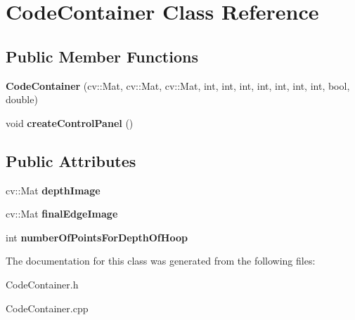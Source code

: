 \hypertarget{classCodeContainer}{
\section{CodeContainer Class Reference}
\label{classCodeContainer}
}
\subsection*{Public Member Functions}
\begin{DoxyCompactItemize}
\item 
\hypertarget{classCodeContainer_a2a811a80e563fe171224eeb2684895df}{
{\bfseries CodeContainer} (cv::Mat, cv::Mat, cv::Mat, int, int, int, int, int, int, int, bool, double)}
\label{classCodeContainer_a2a811a80e563fe171224eeb2684895df}

\item 
\hypertarget{classCodeContainer_a70a3f228bf3526fc607aa79e655a90b7}{
void {\bfseries createControlPanel} ()}
\label{classCodeContainer_a70a3f228bf3526fc607aa79e655a90b7}

\end{DoxyCompactItemize}
\subsection*{Public Attributes}
\begin{DoxyCompactItemize}
\item 
\hypertarget{classCodeContainer_aa6268e4b294280a596d72da042c2f582}{
cv::Mat {\bfseries depthImage}}
\label{classCodeContainer_aa6268e4b294280a596d72da042c2f582}

\item 
\hypertarget{classCodeContainer_a229e9d396276f358aabfd2b7a6a53b3e}{
cv::Mat {\bfseries finalEdgeImage}}
\label{classCodeContainer_a229e9d396276f358aabfd2b7a6a53b3e}

\item 
\hypertarget{classCodeContainer_aa12596e2d7e30c08100432c0d18cf69a}{
int {\bfseries numberOfPointsForDepthOfHoop}}
\label{classCodeContainer_aa12596e2d7e30c08100432c0d18cf69a}

\end{DoxyCompactItemize}


The documentation for this class was generated from the following files:\begin{DoxyCompactItemize}
\item 
CodeContainer.h\item 
CodeContainer.cpp\end{DoxyCompactItemize}
